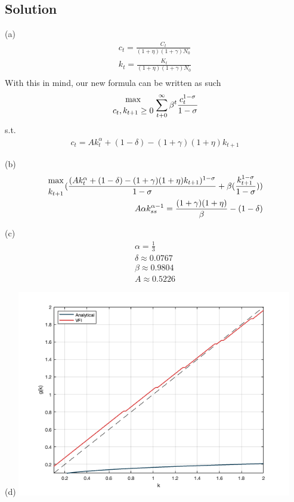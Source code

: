 \documentclass[10pt, a4paper]{article}
\begin{document}
  \subsection*{Solution}
  (a) 
  \begin{align*}
    c_t = \frac{C_t}{(1+\eta)(1+\gamma)N_0} \\
    k_t = \frac{K_t}{(1+\eta)(1+\gamma)N_0} \\
  \end{align*}
  With this in mind, our new formula can be written as such
  \begin{align*}
    {\max\atop{c_t, k_{t+1}\geq0}} \sum_{t+0}^{\infty}\beta^t\frac{c_t^{1-\sigma}}{1-\sigma}
  \end{align*}
  s.t.
  \begin{align*}
    c_t = Ak_t^{\alpha}+(1-\delta)-(1+\gamma)(1+\eta)k_{t+1}
  \end{align*}

  (b) 
  \begin{align*}
    {\max\atop{k_{t+1}}}(\frac{(Ak_t^{\alpha}+(1-\delta)-(1+\gamma)(1+\eta)k_{t+1})^{1-\sigma}}{1-\sigma}+\beta(\frac{k_{t+1}^{1-\sigma}}{1-\sigma})) \\
    A\alpha k_{ss}^{\alpha-1} = \frac{(1+\gamma)(1+\eta)}{\beta}-(1-\delta)
  \end{align*}


  (c) 
  \begin{align*}
    \alpha = \frac{1}{3} \\
    \delta \approx 0.0767 \\
    \beta \approx 0.9804 \\
    A \approx 0.5226
  \end{align*}
  
  (d) \includegraphics*[width = 0.9\textwidth]{2d.png}
\end{document}
